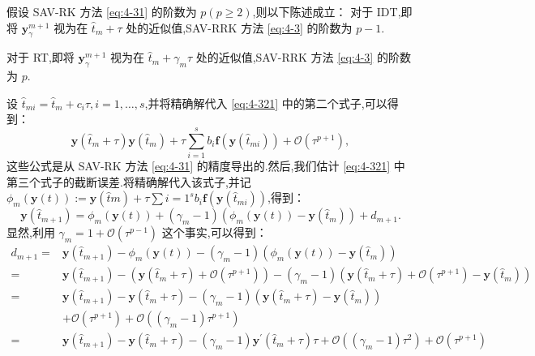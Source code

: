 \begin{thm}\label{thm:5_4}
假设 SAV-RK 方法 \eqref{eq:4-31} 的阶数为 $p (p \geq 2)$,则以下陈述成立：
对于 IDT,即将 $\bm{y}_\gamma^{m+1}$ 视为在 $\hat{t}_m+\tau$ 处的近似值,SAV-RRK 方法 \eqref{eq:4-3} 的阶数为 $p-1$.

对于 RT,即将 $\bm{y}_\gamma^{m+1}$ 视为在 $\hat{t}_m+\gamma_m \tau$ 处的近似值,SAV-RRK 方法 \eqref{eq:4-3} 的阶数为 $p$.
\end{thm} 
\begin{pf}
	设 $\hat{t}_{m i}=\hat{t}_m+c_i \tau, i=1, \ldots, s$,并将精确解代入 \eqref{eq:4-321} 中的第二个式子,可以得到：
    \begin{equation}
\bm{y}\left(\hat{t}_m+\tau\right)\bm{y}\left(\hat{t}_m\right)+\tau \sum_{i=1}^s b_i \bm{f}\left(\bm{y}\left(\hat{t}_{m i}\right)\right)+\mathcal{O}\left(\tau^{p+1}\right),
\end{equation}
这些公式是从 SAV-RK 方法 \eqref{eq:4-31} 的精度导出的.然后,我们估计 \eqref{eq:4-321} 中第三个式子的截断误差.将精确解代入该式子,并记 $\phi_m(\bm{y}(t)):=\bm{y}\left(\hat{t}m\right)+\tau \sum{i=1}^s b_i \bm{f}\left(\bm{y}\left(\hat{t}_{m i}\right)\right)$,得到：
\begin{equation}
	\bm{y}\left(\hat{t}_{m+1}\right)=\phi_m(\bm{y}(t))+\left(\gamma_m-1\right)\left(\phi_m(\bm{y}(t))-\bm{y}\left(\hat{t}_m\right)\right)+d_{m+1} .
\end{equation}
显然,利用 $\gamma_m=1+\mathcal{O}\left(\tau^{p-1}\right)$ 这个事实,可以得到：
\begin{equation}
	\begin{aligned}
		d_{m+1}= & \bm{y}\left(\hat{t}_{m+1}\right)-\phi_m(\bm{y}(t))-\left(\gamma_m-1\right)\left(\phi_m(\bm{y}(t))-\bm{y}\left(\hat{t}_m\right)\right) \\
		= & \bm{y}\left(\hat{t}_{m+1}\right)-\left(\bm{y}\left(\hat{t}_m+\tau\right)+\mathcal{O}\left(\tau^{p+1}\right)\right)-\left(\gamma_m-1\right)\left(\bm{y}\left(\hat{t}_m+\tau\right)+\mathcal{O}\left(\tau^{p+1}\right)-\bm{y}\left(\hat{t}_m\right)\right) \\
		= & \bm{y}\left(\hat{t}_{m+1}\right)-\bm{y}\left(\hat{t}_m+\tau\right)-\left(\gamma_m-1\right)\left(\bm{y}\left(\hat{t}_m+\tau\right)-\bm{y}\left(\hat{t}_m\right)\right) \\
		& +\mathcal{O}\left(\tau^{p+1}\right)+\mathcal{O}\left(\left(\gamma_m-1\right) \tau^{p+1}\right) \\
		= & \bm{y}\left(\hat{t}_{m+1}\right)-\bm{y}\left(\hat{t}_m+\tau\right)-\left(\gamma_m-1\right) \bm{y}^{\prime}\left(\hat{t}_m+\tau\right) \tau+\mathcal{O}\left(\left(\gamma_m-1\right) \tau^2\right)+\mathcal{O}\left(\tau^{p+1}\right) \\

\end{aligned}
\end{equation}
\end{pf}
